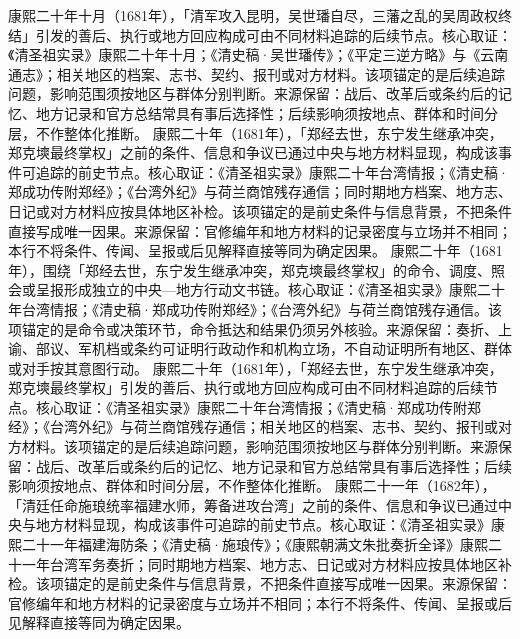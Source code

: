 康熙二十年十月（1681年），「清军攻入昆明，吴世璠自尽，三藩之乱的吴周政权终结」引发的善后、执行或地方回应构成可由不同材料追踪的后续节点。核心取证：《清圣祖实录》康熙二十年十月；《清史稿·吴世璠传》；《平定三逆方略》与《云南通志》；相关地区的档案、志书、契约、报刊或对方材料。该项锚定的是后续追踪问题，影响范围须按地区与群体分别判断。来源保留：战后、改革后或条约后的记忆、地方记录和官方总结常具有事后选择性；后续影响须按地点、群体和时间分层，不作整体化推断。
康熙二十年（1681年），「郑经去世，东宁发生继承冲突，郑克塽最终掌权」之前的条件、信息和争议已通过中央与地方材料显现，构成该事件可追踪的前史节点。核心取证：《清圣祖实录》康熙二十年台湾情报；《清史稿·郑成功传附郑经》；《台湾外纪》与荷兰商馆残存通信；同时期地方档案、地方志、日记或对方材料应按具体地区补检。该项锚定的是前史条件与信息背景，不把条件直接写成唯一因果。来源保留：官修编年和地方材料的记录密度与立场并不相同；本行不将条件、传闻、呈报或后见解释直接等同为确定因果。
康熙二十年（1681年），围绕「郑经去世，东宁发生继承冲突，郑克塽最终掌权」的命令、调度、照会或呈报形成独立的中央—地方行动文书链。核心取证：《清圣祖实录》康熙二十年台湾情报；《清史稿·郑成功传附郑经》；《台湾外纪》与荷兰商馆残存通信。该项锚定的是命令或决策环节，命令抵达和结果仍须另外核验。来源保留：奏折、上谕、部议、军机档或条约可证明行政动作和机构立场，不自动证明所有地区、群体或对手按其意图行动。
康熙二十年（1681年），「郑经去世，东宁发生继承冲突，郑克塽最终掌权」引发的善后、执行或地方回应构成可由不同材料追踪的后续节点。核心取证：《清圣祖实录》康熙二十年台湾情报；《清史稿·郑成功传附郑经》；《台湾外纪》与荷兰商馆残存通信；相关地区的档案、志书、契约、报刊或对方材料。该项锚定的是后续追踪问题，影响范围须按地区与群体分别判断。来源保留：战后、改革后或条约后的记忆、地方记录和官方总结常具有事后选择性；后续影响须按地点、群体和时间分层，不作整体化推断。
康熙二十一年（1682年），「清廷任命施琅统率福建水师，筹备进攻台湾」之前的条件、信息和争议已通过中央与地方材料显现，构成该事件可追踪的前史节点。核心取证：《清圣祖实录》康熙二十一年福建海防条；《清史稿·施琅传》；《康熙朝满文朱批奏折全译》康熙二十一年台湾军务奏折；同时期地方档案、地方志、日记或对方材料应按具体地区补检。该项锚定的是前史条件与信息背景，不把条件直接写成唯一因果。来源保留：官修编年和地方材料的记录密度与立场并不相同；本行不将条件、传闻、呈报或后见解释直接等同为确定因果。
